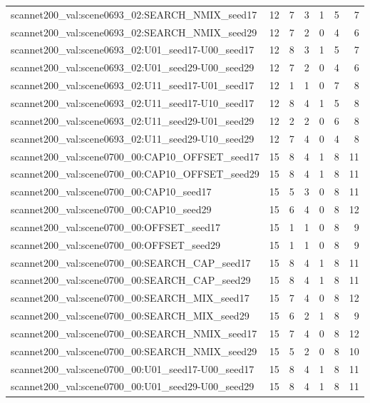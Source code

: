 \begin{table}[t]
\begin{tabular}{lrrrrrr}
scannet200\_val:scene0693\_02:SEARCH\_NMIX\_seed17 & 12 & 7 & 3 & 1 & 5 & 7 \\
scannet200\_val:scene0693\_02:SEARCH\_NMIX\_seed29 & 12 & 7 & 2 & 0 & 4 & 6 \\
scannet200\_val:scene0693\_02:U01\_seed17-U00\_seed17 & 12 & 8 & 3 & 1 & 5 & 7 \\
scannet200\_val:scene0693\_02:U01\_seed29-U00\_seed29 & 12 & 7 & 2 & 0 & 4 & 6 \\
scannet200\_val:scene0693\_02:U11\_seed17-U01\_seed17 & 12 & 1 & 1 & 0 & 7 & 8 \\
scannet200\_val:scene0693\_02:U11\_seed17-U10\_seed17 & 12 & 8 & 4 & 1 & 5 & 8 \\
scannet200\_val:scene0693\_02:U11\_seed29-U01\_seed29 & 12 & 2 & 2 & 0 & 6 & 8 \\
scannet200\_val:scene0693\_02:U11\_seed29-U10\_seed29 & 12 & 7 & 4 & 0 & 4 & 8 \\
scannet200\_val:scene0700\_00:CAP10\_OFFSET\_seed17 & 15 & 8 & 4 & 1 & 8 & 11 \\
scannet200\_val:scene0700\_00:CAP10\_OFFSET\_seed29 & 15 & 8 & 4 & 1 & 8 & 11 \\
scannet200\_val:scene0700\_00:CAP10\_seed17 & 15 & 5 & 3 & 0 & 8 & 11 \\
scannet200\_val:scene0700\_00:CAP10\_seed29 & 15 & 6 & 4 & 0 & 8 & 12 \\
scannet200\_val:scene0700\_00:OFFSET\_seed17 & 15 & 1 & 1 & 0 & 8 & 9 \\
scannet200\_val:scene0700\_00:OFFSET\_seed29 & 15 & 1 & 1 & 0 & 8 & 9 \\
scannet200\_val:scene0700\_00:SEARCH\_CAP\_seed17 & 15 & 8 & 4 & 1 & 8 & 11 \\
scannet200\_val:scene0700\_00:SEARCH\_CAP\_seed29 & 15 & 8 & 4 & 1 & 8 & 11 \\
scannet200\_val:scene0700\_00:SEARCH\_MIX\_seed17 & 15 & 7 & 4 & 0 & 8 & 12 \\
scannet200\_val:scene0700\_00:SEARCH\_MIX\_seed29 & 15 & 6 & 2 & 1 & 8 & 9 \\
scannet200\_val:scene0700\_00:SEARCH\_NMIX\_seed17 & 15 & 7 & 4 & 0 & 8 & 12 \\
scannet200\_val:scene0700\_00:SEARCH\_NMIX\_seed29 & 15 & 5 & 2 & 0 & 8 & 10 \\
scannet200\_val:scene0700\_00:U01\_seed17-U00\_seed17 & 15 & 8 & 4 & 1 & 8 & 11 \\
scannet200\_val:scene0700\_00:U01\_seed29-U00\_seed29 & 15 & 8 & 4 & 1 & 8 & 11 \\

\end{tabular}
\end{table}

